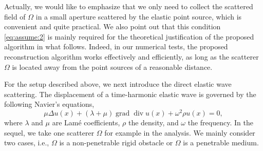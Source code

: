 \documentclass[a4paper,11pt]{article}
\theoremstyle{remark}
\theoremstyle{definition}
\numberwithin{equation}{section}
\DeclareMathOperator{\Div}{div}
\DeclareMathOperator{\grad}{grad}
\begin{document}

Actually, we would like to emphasize that we only need to collect the scattered field of $\Omega$ in a small aperture scattered by the elastic point source, which is convenient and quite practical. We also point out that this condition \eqref{eq:assume:2} is  mainly required for the theoretical justification of the proposed algorithm in what follows. Indeed, in our numerical tests, the proposed reconstruction algorithm works effectively and efficiently, as long as the scatterer $\Omega$ is located away from the point sources of a reasonable distance.

For the setup described above, we next introduce the direct elastic wave scattering. The displacement of a time-harmonic elastic wave is governed by the following Navier's equations,
\begin{equation}\label{eq:elastic:wave}
\mu \Delta u(x) +(\lambda + \mu) \grad \Div u(x) + \omega^2 \rho  u(x)  = 0,
\end{equation}
where $\lambda$ and $\mu$ are Lam\'{e} coefficients, $\rho$ the density, and $\omega$ the frequency. In the sequel, we take one scatterer $\Omega$ for example in the analysis. We mainly consider two cases, i.e., $\Omega$ is a non-penetrable rigid obstacle or  $\Omega$ is a penetrable medium.
\end{document}
